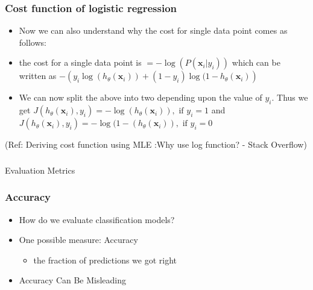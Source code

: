 \begin{frame}[fragile]\frametitle{Cost function of logistic regression}
\begin{itemize}
\item Now we can also understand why the cost for single data point comes as follows:
\item the cost for a single data point is $=  -\log( P(\mathbf{x}_i | y_i))$ which can be written as $- \left ( y_i \log (h_{\theta}(\mathbf{x}_i)) + (1 - y_i) \log (1 - h_{\theta}(\mathbf{x}_i) \right )$
\item We can now split the above into two depending upon the value of $y_i$. Thus we get $J(h_{\theta}(\mathbf{x}_i), y_i) = - \log (h_{\theta}(\mathbf{x}_i))  , \text{     if } y_i=1$ and
$ J(h_{\theta}(\mathbf{x}_i), y_i) = - \log (1 -  (h_{\theta}(\mathbf{x}_i) )  , \text{    if } y_i=0$
\end{itemize}

{\tiny (Ref: Deriving cost function using MLE :Why use log function? - Stack Overflow)}
\end{frame}



\begin{frame}[fragile]\frametitle{}
\begin{center}
{\Large Evaluation Metrics}
\end{center}
\end{frame}


\begin{frame}[fragile]\frametitle{Accuracy}
\begin{itemize}
\item How do we evaluate classification models?
\item One possible measure: Accuracy
	\begin{itemize}
	\item the fraction of predictions we got right
	\end{itemize}
\item Accuracy Can Be Misleading
\end{itemize}

\end{frame}


